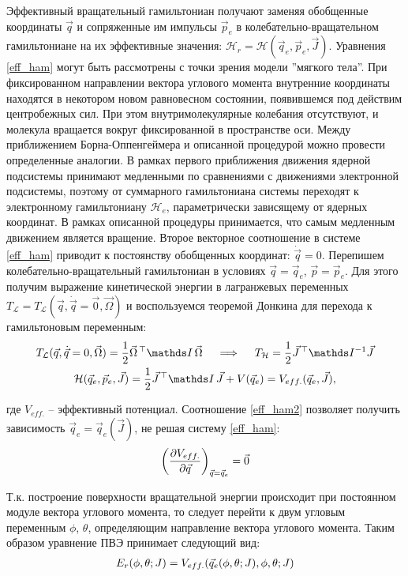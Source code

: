 Эффективный вращательный гамильтониан получают заменяя обобщенные координаты $\vec{q}$ и сопряженные им импульсы $\vec{p}_e$ в колебательно-вращательном гамильтониане на их эффективные значения: $\mathcal{H}_r = \mathcal{H} (\vec{q}_e, \vec{p}_e, \vec{J})$.
Уравнения \eqref{eff_ham} могут быть рассмотрены с точки зрения модели ''мягкого тела''. При фиксированном направлении вектора углового момента внутренние координаты находятся в некотором новом равновесном состоянии, появившемся под действим центробежных сил. При этом внутримолекулярные колебания отсутствуют, и молекула вращается вокруг фиксированной в пространстве оси.
Между приближением Борна-Оппенгеймера и описанной процедурой можно провести определенные аналогии. В рамках первого приближения движения ядерной подсистемы принимают медленными по сравнениями с движениями электронной подсистемы, поэтому от суммарного гамильтониана системы переходят к электронному гамильтониану $\mathcal{H}_e$, параметрически зависящему от ядерных координат. В рамках описанной процедуры принимается, что самым медленным движением является вращение.
Второе векторное соотношение в системе \eqref{eff_ham} приводит к постоянству обобщенных координат: $\dot{\vec{q}} = 0$. Перепишем колебательно-вращательный гамильтониан в условиях $\vec{q} = \vec{q}_e$, $\vec{p} = \vec{p}_e$. Для этого получим выражение кинетической энергии в лагранжевых переменных $T_\mathcal{L} = T_\mathcal{L} (\vec{q}, \dot{\vec{q}} = \vec{0}, \vec{\Omega})$ и воспользуемся теоремой Донкина для перехода к гамильтоновым переменным:
\vverh
\begin{gather}
T_\mathcal{L}(\vec{q}, \dot{\vec{q}} = 0, \vec{\Omega}) = \frac{1}{2} \vec{\Omega}^{\, \top} \bbI \, \vec{\Omega} \quad \implies \quad T_\mathcal{H} = \frac{1}{2} \vec{J}^{\, \top} \bbI^{-1} \vec{J} \notag \\
\mathcal{H}(\vec{q}_e, \vec{p}_e, \vec{J}) = \frac{1}{2} \vec{J}^{\, \top} \bbI \, \vec{J} + V(\vec{q}_e) = V_{eff.} (\vec{q}_e, \vec{J}), \label{eff_ham2}
\end{gather}

\vlevo где $V_{eff.}$ -- эффективный потенциал. Соотношение \eqref{eff_ham2} позволяет получить зависимость $\vec{q}_e = \vec{q}_e (\vec{J})$, не решая систему \eqref{eff_ham}:
\begin{gather}
\left( \frac{\partial V_{eff.}}{\partial \vec{q}} \right)_{\vec{q} = \vec{q}_e} = \vec{0} \notag
\end{gather}

Т.к. построение поверхности вращательной энергии происходит при постоянном модуле вектора углового момента, то следует перейти к двум угловым переменным $\phi$, $\theta$, определяющим направление вектора углового момента. Таким образом уравнение ПВЭ принимает следующий вид: 
\vverh
\begin{gather}
E_r (\phi, \theta; J) = V_{eff.} (\vec{q}_e (\phi, \theta; J), \phi, \theta; J) \notag
\end{gather}

